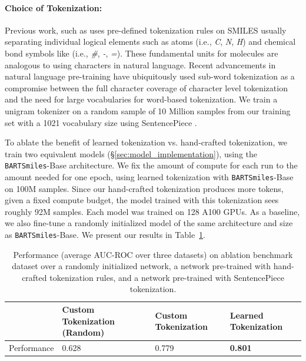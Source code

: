 \documentclass{article} %
\newcommand{\MODEL}{\texttt{BARTSmiles}}
\begin{document}
\paragraph{Choice of Tokenization:}
Previous work, such as \citet{SMILES_BERT} uses pre-defined tokenization rules on SMILES usually separating individual logical elements such as atoms (i.e., \textit{C}, \textit{N}, \textit{H}) and chemical bond symbols like (i.e., \textit{\#}, \textit{-}, \textit{=}). These fundamental units for molecules are analogous to using characters in natural language. Recent advancements in natural language pre-training have ubiquitously used sub-word tokenization as a compromise between the full character coverage of character level tokenization and the need for large vocabularies for word-based tokenization. We train a unigram tokenizer on a random sample of 10 Million samples from our training set with a 1021 vocabulary size using SentencePiece \citep{sentencepiece}. 

To ablate the benefit of learned tokenization vs. hand-crafted tokenization, we train two equivalent models (\S\ref{sec:model_implementation}), using the \MODEL{}-Base architecture. We fix the amount of compute for each run to the amount needed for one epoch, using learned tokenization with \MODEL{}-Base on 100M samples. Since our hand-crafted tokenization produces more tokens, given a fixed compute budget, the model trained with this tokenization sees roughly 92M samples. Each model was trained on 128 A100 GPUs. As a baseline, we also fine-tune a randomly initialized model of the same architecture and size as \MODEL{}-Base. We present our results in Table~\ref{table:tokenization_ablation}.

\begin{table}[h]
\centering
\begin{tabular}{@{}llll@{}}
\toprule
            & Custom Tokenization (Random) & Custom Tokenization & Learned Tokenization \\ \midrule
Performance & 0.628            & 0.779                     &   \textbf{0.801}           \\ \bottomrule
\end{tabular}
\caption{Performance (average AUC-ROC over three datasets) on ablation benchmark dataset over a randomly initialized network, a network pre-trained with hand-crafted tokenization rules, and a network pre-trained with SentencePiece tokenization.}
\label{table:tokenization_ablation}
\end{table}
\end{document}
